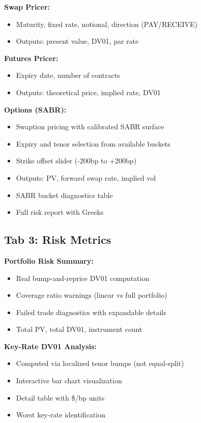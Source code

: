 \documentclass[12pt,a4paper]{report}
\begin{document}
\textbf{Swap Pricer:}
\begin{itemize}
    \item Maturity, fixed rate, notional, direction (PAY/RECEIVE)
    \item Outputs: present value, DV01, par rate
\end{itemize}

\textbf{Futures Pricer:}
\begin{itemize}
    \item Expiry date, number of contracts
    \item Outputs: theoretical price, implied rate, DV01
\end{itemize}

\textbf{Options (SABR):}
\begin{itemize}
    \item Swaption pricing with calibrated SABR surface
    \item Expiry and tenor selection from available buckets
    \item Strike offset slider (-200bp to +200bp)
    \item Outputs: PV, forward swap rate, implied vol
    \item SABR bucket diagnostics table
    \item Full risk report with Greeks
\end{itemize}

\subsection{Tab 3: Risk Metrics}

\textbf{Portfolio Risk Summary:}
\begin{itemize}
    \item Real bump-and-reprice DV01 computation
    \item Coverage ratio warnings (linear vs full portfolio)
    \item Failed trade diagnostics with expandable details
    \item Total PV, total DV01, instrument count
\end{itemize}

\textbf{Key-Rate DV01 Analysis:}
\begin{itemize}
    \item Computed via localized tenor bumps (not equal-split)
    \item Interactive bar chart visualization
    \item Detail table with \$/bp units
    \item Worst key-rate identification
\end{itemize}
\end{document}
